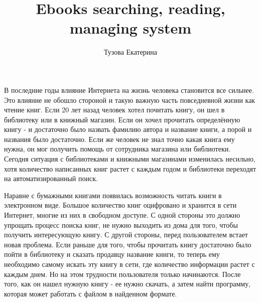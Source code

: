 \documentclass[a4paper]{report}
\begin{document}
\author{Тузова Екатерина}
\title{Ebooks searching, reading, managing system}

\maketitle




\newpage
\tableofcontents
\newpage

В последние годы влияние Интернета на жизнь человека становится все сильнее. Это влияние не обошло стороной и такую важную часть повседневной жизни как чтение книг. Если 20 лет назад человек хотел почитать книгу, он шел в библиотеку или в книжный магазин. Если он хочел прочитать определённую книгу - и достаточно было назвать фамилию автора и название книги, а порой и названия было достаточно. Если же человек не знал точно какая книга ему нужна, он мог получить помощь от сотрудника магазина или библиотеки. Сегодня ситуация с библиотеками и книжными магазинами изменилась несильно, хотя количество написанных книг растет с каждым годом и библиотеки переходят на автоматизированный поиск. 

Наравне с бумажными книгами появилась возможность читать книги в электронном виде. Большое количество книг оцифровано и хранится в сети Интернет, многие из них в свободном доступе. С одной стороны это должно упрощать процесс поиска книг, не нужно выходить из дома для того, чтобы получить интересующую книгу. С другой стороны, перед пользователем встает новая проблема. Если раньше для того, чтобы прочитать книгу достаточно было пойти в библиотеку и сказать продавцу название книги, то теперь ему необходимо самому искать эту книгу в сети, где количество информации растет с каждым днем. Но на этом трудности пользователя только начинаются. После того, как он нашел нужную книгу - ее нужно скачать, а затем найти программу, которая может работать с файлом в найденном формате. 
\end{document}
